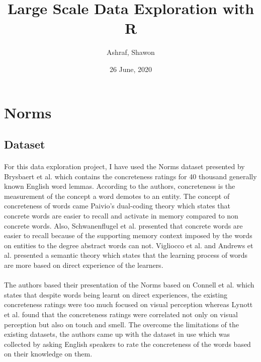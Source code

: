 \documentclass[11pt,a4paper]{article}
\begin{document}
\title{Large Scale Data Exploration with R}
\author{Ashraf, Shawon}
\date{26 June, 2020}

\maketitle


\section{Norms}

\subsection{Dataset}

\paragraph{}
For this data exploration project, I have used the Norms dataset presented by Brysbaert et al. \cite{brys} which contains the concreteness ratings for 40 thousand generally known English word lemmas. According to the authors, concreteness is the measurement of the concept a word demotes to an entity. The concept of concreteness of words came Paivio’s dual-coding theory \cite{paivio} which states that concrete words are easier to recall and activate in memory compared to non concrete words. Also,  Schwanenflugel et al. \citep{schwanenflugel} presented that concrete words are easier to recall because of the supporting memory context imposed by the words on entities to the degree abstract words can not. Vigliocco et al. \cite{vigliocco_vinson_lewis_garrett_2004} and Andrews et al. \cite{andrews_vigliocco_vinson_2009} presented a semantic theory which states that the learning process of words are more based on direct experience of the learners.

\paragraph{}
The authors based their presentation of the Norms based on Connell et al. \cite{connell} which states that despite words being learnt on direct experiences, the existing concreteness ratings were too much focused on visual perception whereas Lynott et al. found that the concreteness ratings were correlated not only on visual perception but also on touch and smell. The overcome the limitations of the existing datasets, the authors came up with the dataset in use which was collected by asking English speakers to rate the concreteness of the words based on their knowledge on them.
\end{document}
